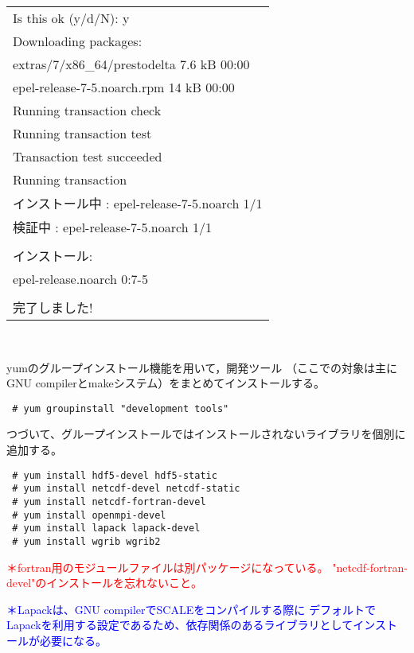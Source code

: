 {{{\begin{tabularx}{140mm}{l}
Is this ok (y/d/N): y\\
Downloading packages:\\
extras/7/x86\_64/prestodelta                                 7.6 kB   00:00\\
epel-release-7-5.noarch.rpm                                  14 kB   00:00\\
Running transaction check\\
Running transaction test\\
Transaction test succeeded\\
Running transaction\\
  インストール中          : epel-release-7-5.noarch                         1/1\\
  検証中                  : epel-release-7-5.noarch                         1/1\\
\\
インストール:\\
  epel-release.noarch 0:7-5\\
\\
完了しました!\\
\end{tabularx}
}}}\\


\noindent yumのグループインストール機能を用いて，開発ツール
（ここでの対象は主にGNU compilerとmakeシステム）をまとめてインストールする。
\begin{verbatim}
 # yum groupinstall "development tools"
\end{verbatim}

\noindent つづいて、グループインストールではインストールされないライブラリを個別に追加する。
\begin{verbatim}
 # yum install hdf5-devel hdf5-static
 # yum install netcdf-devel netcdf-static
 # yum install netcdf-fortran-devel
 # yum install openmpi-devel
 # yum install lapack lapack-devel
 # yum install wgrib wgrib2
\end{verbatim}

\noindent \textcolor{red}{\small ＊fortran用のモジュールファイルは別パッケージになっている。
"netcdf-fortran-devel"のインストールを忘れないこと。}

\noindent \textcolor{blue}{\small ＊Lapackは、GNU compilerでSCALEをコンパイルする際に
デフォルトでLapackを利用する設定であるため、依存関係のあるライブラリとしてインストールが必要になる。}

